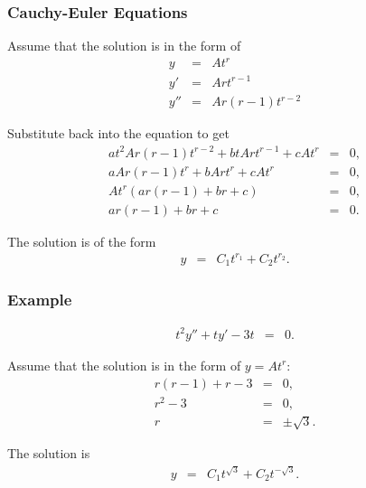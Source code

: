 \documentclass{beamer}
\newcommand{\lp}{\left(}
\newcommand{\rp}{\right)}
\begin{document}
\begin{frame}
  \frametitle{Cauchy-Euler Equations}

  Assume that the solution is in the form of
  \begin{eqnarray*}
    y & = & A t^r \\
    y' & = & A r t^{r-1} \\
    y'' & = & A r (r-1) t^{r-2}
  \end{eqnarray*}

  Substitute back into the equation to get
  \begin{eqnarray*}
    a t^2 A r (r-1) t^{r-2} + b t A r t^{r-1} + c A t^r & = & 0, \\
    a A r (r-1) t^{r} + b A r t^{r} + c A t^r & = & 0,  \\
    A t^r \lp a r (r-1) + br + c \rp & = & 0, \\
    a r (r-1) + br + c & = & 0.
  \end{eqnarray*}

  The solution is of the form
  \begin{eqnarray*}
    y & = & C_1 t^{r_1} + C_2 t^{r_2}.
  \end{eqnarray*}
  

\end{frame}


\begin{frame}
  \frametitle{Example}

  \begin{eqnarray*}
    t^2 y'' + t y' - 3t & = & 0.
  \end{eqnarray*}

  Assume that the solution is in the form of $y=At^r$:
  \begin{eqnarray*}
    r(r-1) + r - 3 & = & 0, \\
    r^2 - 3 & = & 0, \\
    r & = & \pm \sqrt{3}.
  \end{eqnarray*}

  The solution is 
  \begin{eqnarray*}
    y & = & C_1 t^{\sqrt{3}} + C_2 t^{-\sqrt{3}}.
  \end{eqnarray*}

\end{frame}
\end{document}
